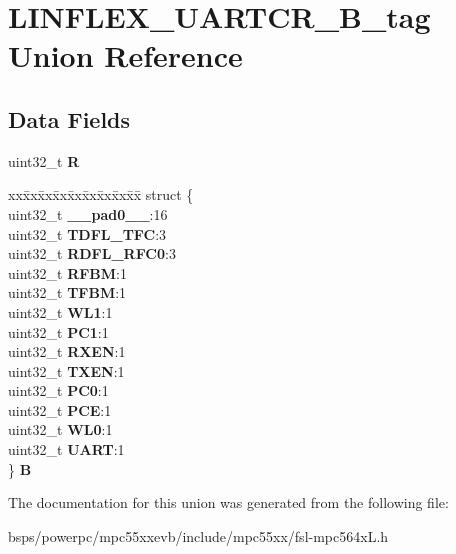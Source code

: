 \hypertarget{unionLINFLEX__UARTCR__32B__tag}{}\section{L\+I\+N\+F\+L\+E\+X\+\_\+\+U\+A\+R\+T\+C\+R\+\_\+B\+\_\+tag Union Reference}
\label{unionLINFLEX__UARTCR__32B__tag}
\subsection*{Data Fields}
\begin{DoxyCompactItemize}
\item 
\mbox{\label{unionLINFLEX__UARTCR__32B__tag_a8b38f18897d2f6e46f6407f3d39a9448}} 
uint32\+\_\+t {\bfseries R}
\item 
\mbox{\label{unionLINFLEX__UARTCR__32B__tag_ac103895dd7abee34a09fd5a17e07b453}} 
\begin{tabbing}
xx\=xx\=xx\=xx\=xx\=xx\=xx\=xx\=xx\=\kill
struct \{\\
\>uint32\_t {\bfseries \_\_pad0\_\_}:16\\
\>uint32\_t {\bfseries TDFL\_TFC}:3\\
\>uint32\_t {\bfseries RDFL\_RFC0}:3\\
\>uint32\_t {\bfseries RFBM}:1\\
\>uint32\_t {\bfseries TFBM}:1\\
\>uint32\_t {\bfseries WL1}:1\\
\>uint32\_t {\bfseries PC1}:1\\
\>uint32\_t {\bfseries RXEN}:1\\
\>uint32\_t {\bfseries TXEN}:1\\
\>uint32\_t {\bfseries PC0}:1\\
\>uint32\_t {\bfseries PCE}:1\\
\>uint32\_t {\bfseries WL0}:1\\
\>uint32\_t {\bfseries UART}:1\\
\} {\bfseries B}\\

\end{tabbing}\end{DoxyCompactItemize}


The documentation for this union was generated from the following file\+:\begin{DoxyCompactItemize}
\item 
bsps/powerpc/mpc55xxevb/include/mpc55xx/fsl-\/mpc564x\+L.\+h\end{DoxyCompactItemize}
